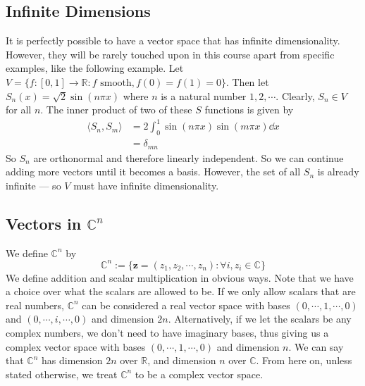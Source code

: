 \documentclass{article}
\begin{document}
\subsection{Infinite Dimensions}
It is perfectly possible to have a vector space that has infinite dimensionality. However, they will be rarely touched upon in this course apart from specific examples, like the following example. Let $V = \{ f: [0, 1] \to \mathbb R: f \text{ smooth}, f(0) = f(1) = 0\}$. Then let $S_n(x) = \sqrt 2 \sin(n \pi x)$ where $n$ is a natural number $1, 2, \cdots$. Clearly, $S_n \in V$ for all $n$. The inner product of two of these $S$ functions is given by
\begin{align*}
	\langle S_n, S_m \rangle & = 2 \int_0^1 \sin(n \pi x) \sin(m \pi x) \dd x \\
	                         & = \delta_{mn}
\end{align*}
So $S_n$ are orthonormal and therefore linearly independent. So we can continue adding more vectors until it becomes a basis. However, the set of all $S_n$ is already infinite --- so $V$ must have infinite dimensionality.

\subsection{Vectors in $\mathbb C^n$}
We define $\mathbb C^n$ by
\[ \mathbb C^n := \{ \bm z = (z_1, z_2, \cdots, z_n): \forall i, z_i \in \mathbb C \} \]
We define addition and scalar multiplication in obvious ways. Note that we have a choice over what the scalars are allowed to be. If we only allow scalars that are real numbers, $\mathbb C^n$ can be considered a real vector space with bases $(0, \cdots, 1, \cdots, 0)$ and $(0, \cdots, i, \cdots, 0)$ and dimension $2n$. Alternatively, if we let the scalars be any complex numbers, we don't need to have imaginary bases, thus giving us a complex vector space with bases $(0, \cdots, 1, \cdots, 0)$ and dimension $n$. We can say that $\mathbb C^n$ has dimension $2n$ over $\mathbb R$, and dimension $n$ over $\mathbb C$. From here on, unless stated otherwise, we treat $\mathbb C^n$ to be a complex vector space.
\end{document}
